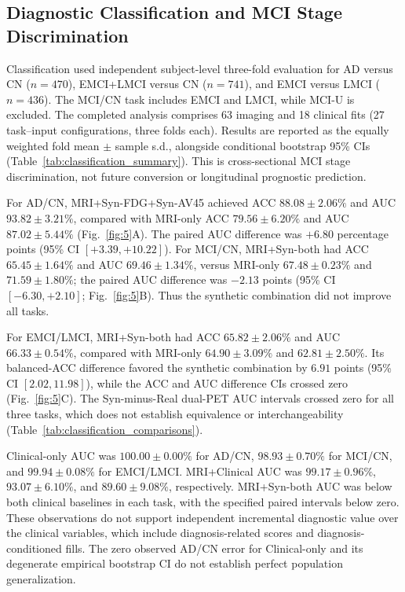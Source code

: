 \documentclass{article}
\begin{document}
\subsection{Diagnostic Classification and MCI Stage Discrimination}
Classification used independent subject-level three-fold evaluation for AD versus CN ($n=470$), EMCI+LMCI versus CN ($n=741$), and EMCI versus LMCI ($n=436$). The MCI/CN task includes EMCI and LMCI, while MCI-U is excluded. The completed analysis comprises 63 imaging and 18 clinical fits (27 task--input configurations, three folds each). Results are reported as the equally weighted fold mean $\pm$ sample s.d., alongside conditional bootstrap 95\% CIs (Table~\ref{tab:classification_summary}). This is cross-sectional MCI stage discrimination, not future conversion or longitudinal prognostic prediction.

For AD/CN, MRI+Syn-FDG+Syn-AV45 achieved ACC $88.08\pm2.06\%$ and AUC $93.82\pm3.21\%$, compared with MRI-only ACC $79.56\pm6.20\%$ and AUC $87.02\pm5.44\%$ (Fig.~\ref{fig:5}A). The paired AUC difference was $+6.80$ percentage points (95\% CI $[+3.39,+10.22]$). For MCI/CN, MRI+Syn-both had ACC $65.45\pm1.64\%$ and AUC $69.46\pm1.34\%$, versus MRI-only $67.48\pm0.23\%$ and $71.59\pm1.80\%$; the paired AUC difference was $-2.13$ points (95\% CI $[-6.30,+2.10]$; Fig.~\ref{fig:5}B). Thus the synthetic combination did not improve all tasks.

For EMCI/LMCI, MRI+Syn-both had ACC $65.82\pm2.06\%$ and AUC $66.33\pm0.54\%$, compared with MRI-only $64.90\pm3.09\%$ and $62.81\pm2.50\%$. Its balanced-ACC difference favored the synthetic combination by $6.91$ points (95\% CI $[2.02,11.98]$), while the ACC and AUC difference CIs crossed zero (Fig.~\ref{fig:5}C). The Syn-minus-Real dual-PET AUC intervals crossed zero for all three tasks, which does not establish equivalence or interchangeability (Table~\ref{tab:classification_comparisons}).

Clinical-only AUC was $100.00\pm0.00\%$ for AD/CN, $98.93\pm0.70\%$ for MCI/CN, and $99.94\pm0.08\%$ for EMCI/LMCI. MRI+Clinical AUC was $99.17\pm0.96\%$, $93.07\pm6.10\%$, and $89.60\pm9.08\%$, respectively. MRI+Syn-both AUC was below both clinical baselines in each task, with the specified paired intervals below zero. These observations do not support independent incremental diagnostic value over the clinical variables, which include diagnosis-related scores and diagnosis-conditioned fills. The zero observed AD/CN error for Clinical-only and its degenerate empirical bootstrap CI do not establish perfect population generalization.
\end{document}
